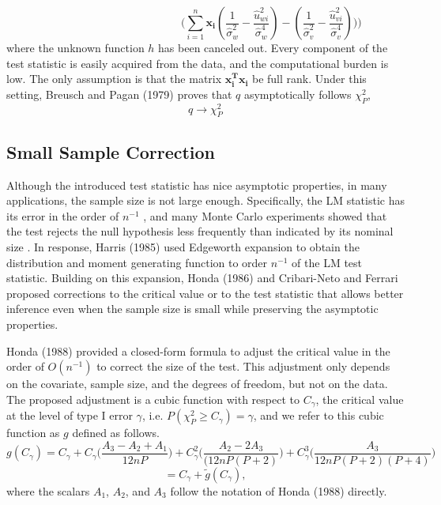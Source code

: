 \documentclass[12pt]{article}
\theoremstyle{theorem}
\begin{document}
$$\hspace{5cm} \bigg(
\sum_{i=1}^{n} \bm{x_{i}} 
\left(
\frac{1}{\hat{\sigma}_w^2} - \frac{\hat{u}_{wi}^2}{\hat{\sigma}_w^4}\right)  - \left( \frac{1}{\hat{\sigma}_v^2} - \frac{\hat{u}_{vi}^2}{\hat{\sigma}_v^4}
\right)
\bigg) \bigg)$$
where the unknown function $h$ has been canceled out. Every component of the test statistic is easily acquired from the data, and the computational burden is low. The only assumption is that the matrix $\bm{x_i^T x_i}$ be full rank. Under this setting, Breusch and Pagan (1979) \cite{breusch1979simple} proves that $q$ asymptotically follows $\chi_{P}^2$,
$$q \rightarrow \chi_P^2$$

\subsection{Small Sample Correction}
Although the introduced test statistic has nice asymptotic properties, in many applications, the sample size is not large enough. Specifically, the LM statistic has its error in the order of $n^{-1}$ \cite{harris1985asymptotic}, and many Monte Carlo experiments showed that the test rejects the null hypothesis less frequently than indicated by its nominal size \cite{honda1988size} \cite{godfrey1978testing} \cite{griffiths1986monte}. In response, Harris (1985) \cite{harris1985asymptotic} used Edgeworth expansion to obtain the distribution and moment generating function to order $n^{-1}$ of the LM test statistic. Building on this expansion, Honda (1986) \cite{honda1988size} and Cribari-Neto and Ferrari \cite{cribari1995improved} \cite{cribari2001monotonic} proposed corrections to the critical value or to the test statistic that allows better inference even when the sample size is small while preserving the asymptotic properties. 

\vspace{5mm} \noindent
Honda (1988) provided a closed-form formula to adjust the critical value in the order of $O(n^{-1})$ to correct the size of the test. This adjustment only depends on the covariate, sample size, and the degrees of freedom, but not on the data. The proposed adjustment is a cubic function with respect to $C_{\gamma}$, the critical value at the level of type I error $\gamma$, i.e. $P(\chi_{P}^2 \geq C_{\gamma}) = \gamma$, and we refer to this cubic function as $g$ defined as follows.
\begin{equation}
g(C_{\gamma}) = C_{\gamma} + C_{\gamma}\bigg(\frac{A_3 - A_2 + A_1}{12nP}\bigg) + C_{\gamma}^2\bigg(\frac{A_2 - 2A_3}{(12nP(P+2)}\bigg) + C_{\gamma}^3 \bigg(\frac{A_3}{12nP(P+2)(P+4)}\bigg)
\label{hondacorrection}
\end{equation}
$$ = C_{\gamma} + \tilde{g}(C_{\gamma}),$$
where the scalars $A_1$, $A_2$, and $A_3$ follow the notation of Honda (1988) directly. 
\end{document}
